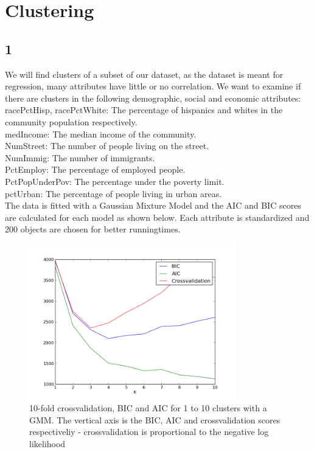 \documentclass[a4paper,10pt]{article}
\begin{document}
\author{Valentin Rosenberg, Zacharias Knudsen}
\date{\today}

\section{Clustering}

\subsection{1}
We will find clusters of a subset of our dataset, as the dataset is meant for regression, many attributes have little or no correlation. We want to examine if there are clusters in the following demographic, social and economic attributes:\\
racePctHisp, racePctWhite: The percentage of hispanics and whites in the community population respectively.\\
medIncome: The median income of the community.\\
NumStreet: The number of people living on the street.\\
NumImmig: The number of immigrants.\\
PctEmploy: The percentage of employed people.\\
PctPopUnderPov: The percentage under the poverty limit.\\
pctUrban: The percentage of people living in urban areas.\\

The data is fitted with a Gaussian Mixture Model and the AIC and BIC scores are calculated for each model as shown below. Each attribute is standardized and 200 objects are chosen for better runningtimes. 

\begin{figure}[h]
\centering
\includegraphics[h, width=0.8\textwidth]{figure_1}
\caption{10-fold crossvalidation, BIC and AIC for 1 to 10 clusters with a GMM. The vertical axis is the BIC, AIC and crossvalidation scores respectiveliy - crossvalidation is proportional to the negative log likelihood}
\end{figure}
\end{document}
